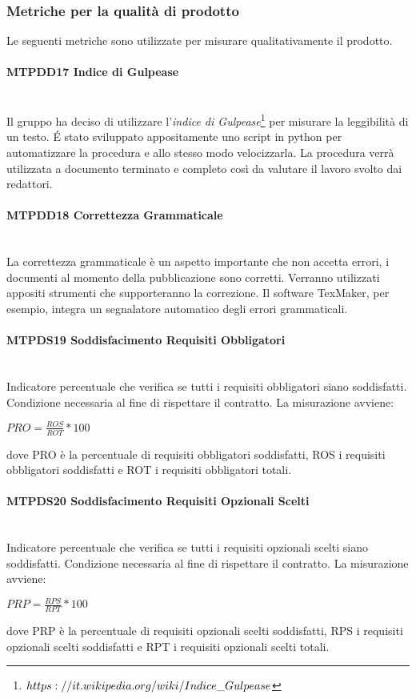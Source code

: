 \subsubsection{Metriche per la qualità di prodotto}
Le seguenti metriche sono utilizzate per misurare qualitativamente il prodotto.

\paragraph{MTPDD17 Indice di Gulpease}\-\\
Il gruppo ha deciso di utilizzare l'\textit{indice di Gulpease}\glossario\footnote{\texttt{$https://it.wikipedia.org/wiki/Indice\char`_Gulpease$}} per misurare la leggibilità di un testo. \'E stato sviluppato appositamente uno script in python per automatizzare la procedura e allo stesso modo velocizzarla. La procedura verrà utilizzata a documento terminato e completo così da valutare il lavoro svolto dai redattori.

\paragraph{MTPDD18 Correttezza Grammaticale}\-\\
La correttezza grammaticale è un aspetto importante che non accetta errori, i documenti al momento della pubblicazione sono corretti. Verranno utilizzati appositi strumenti che supporteranno la correzione. Il software TexMaker, per esempio, integra un segnalatore automatico degli errori grammaticali. 

\paragraph{MTPDS19 Soddisfacimento Requisiti Obbligatori}\-\\
Indicatore percentuale che verifica se tutti i requisiti obbligatori siano soddisfatti. Condizione necessaria al fine di rispettare il contratto. La misurazione avviene:
\begin{center}
	\item $PRO = \frac{ROS}{ROT}*100$
\end{center}
dove PRO è la percentuale di requisiti obbligatori soddisfatti, ROS i requisiti obbligatori soddisfatti e ROT i requisiti obbligatori totali.

\paragraph{MTPDS20 Soddisfacimento Requisiti Opzionali Scelti}\-\\
Indicatore percentuale che verifica se tutti i requisiti opzionali scelti siano soddisfatti. Condizione necessaria al fine di rispettare il contratto. La misurazione avviene:
\begin{center}
	\item $PRP = \frac{RPS}{RPT}*100$
\end{center}
dove PRP è la percentuale di requisiti opzionali scelti soddisfatti, RPS i requisiti opzionali scelti soddisfatti e RPT i requisiti opzionali scelti totali.

